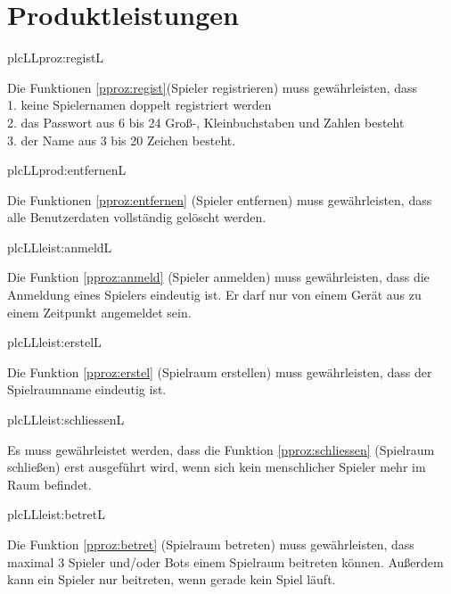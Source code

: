 \chapter{Produktleistungen}

\setcounter{plc}{10}

\begin{description}[leftmargin=5em, style=sameline]

	\begin{lhp}{plc}{LL}{proz:registL}
		\item Die Funktionen \ref{pproz:regist}(Spieler registrieren) muss gewährleisten, dass \\
		1. keine Spielernamen doppelt registriert werden \\
		2. das Passwort aus 6 bis 24 Groß-, Kleinbuchstaben und Zahlen besteht \\
		3. der Name aus 3 bis 20 Zeichen besteht.
	\end{lhp}
	
	\begin{lhp}{plc}{LL}{prod:entfernenL}
		\item Die Funktionen \ref{pproz:entfernen} (Spieler entfernen) muss gewährleisten, dass \\
		 alle Benutzerdaten vollständig gelöscht werden.
	\end{lhp}
	
	\begin{lhp}{plc}{LL}{leist:anmeldL}
		\item Die Funktion \ref{pproz:anmeld} (Spieler anmelden) muss gewährleisten, dass die Anmeldung eines Spielers eindeutig ist. Er darf nur von einem Gerät aus zu einem Zeitpunkt angemeldet sein.
	\end{lhp}
	
	\begin{lhp}{plc}{LL}{leist:erstelL}
		\item Die Funktion \ref{pproz:erstel} (Spielraum erstellen) muss gewährleisten, dass der Spielraumname eindeutig ist.
	\end{lhp}
	
	\begin{lhp}{plc}{LL}{leist:schliessenL}
		\item Es muss gewährleistet werden, dass die Funktion \ref{pproz:schliessen} (Spielraum schließen) erst ausgeführt wird, wenn sich kein menschlicher Spieler mehr im Raum befindet.
	\end{lhp}
	
	\begin{lhp}{plc}{LL}{leist:betretL}
		\item Die Funktion \ref{pproz:betret} (Spielraum betreten) muss gewährleisten, dass maximal 3 Spieler und/oder Bots einem Spielraum beitreten können. Außerdem kann ein Spieler nur beitreten, wenn gerade kein Spiel läuft.
	\end{lhp}
	

\end{description}
